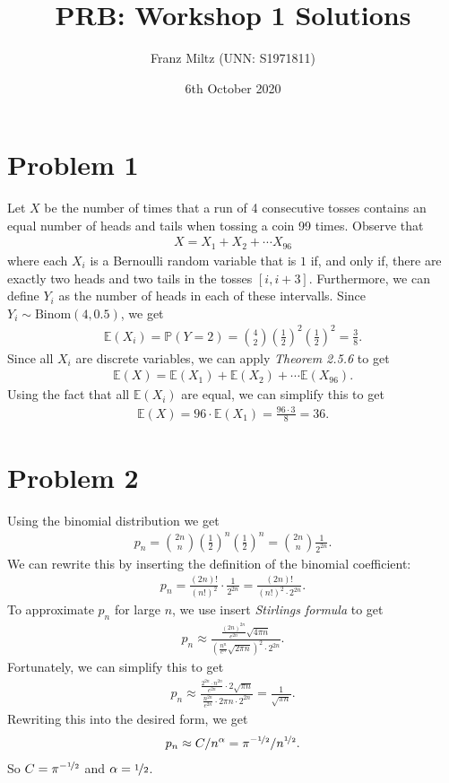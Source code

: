 \documentclass{article}
\title{PRB: Workshop 1 Solutions}
\author{Franz Miltz (UNN: S1971811)}
\renewcommand{\P}{\mathbb{P}}
\newcommand{\E}{\mathbb{E}}
\begin{document}
\date{6th October 2020}
\maketitle
\section*{Problem 1}
Let $X$ be the number of times that a run of 4 consecutive tosses
contains an equal number of heads and tails when tossing a coin 99 times.
Observe that
\begin{align*}
  X=X_1 + X_2 + \cdots X_{96}
\end{align*}
where each $X_i$ is a Bernoulli random variable that is $1$ if, 
and only if, there are exactly two heads and two tails in the tosses
$[i, i+3]$. Furthermore, we can define $Y_i$ as the number of heads
in each of these intervalls. Since $Y_i\sim \text{Binom}(4,0.5)$,
we get
\begin{align*}
  \E(X_i) = \P(Y=2) = \binom{4}{2}\left(\frac{1}{2}\right)^2\left(\frac{1}{2}\right)^2=\frac{3}{8}.
\end{align*}
Since all $X_i$ are discrete variables, we can apply \emph{Theorem 2.5.6}
to get
\begin{align*}
  \E(X) = \E(X_1) + \E(X_2) + \cdots \E(X_{96}).
\end{align*}
Using the fact that all $\E(X_i)$ are equal, we can simplify this to get
\begin{align*}
  \E(X) = 96\cdot\E(X_1) = \frac{96\cdot3}{8}=36.
\end{align*}
\section*{Problem 2}
Using the binomial distribution we get
\begin{align*}
  p_n = \binom{2n}{n}\left(\frac{1}{2}\right)^n\left(\frac{1}{2}\right)^n
  =\binom{2n}{n}\frac{1}{2^{2n}}.
\end{align*}
We can rewrite this by inserting the definition of the binomial
coefficient:
\begin{align*}
  p_n = \frac{(2n)!}{(n!)^2}\cdot\frac{1}{2^{2n}}=\frac{(2n)!}{(n!)^2\cdot 2^{2n}}.
\end{align*}
To approximate $p_n$ for large $n$, we use insert \emph{Stirlings formula}
to get
\begin{align*}
  p_n \approx \frac{
    \frac{(2n)^{2n}}{e^{2n}}\sqrt{4\pi n}
  }{
    \left(\frac{n^n}{e^n}\sqrt{2\pi n}\right)^2\cdot 2^{2n}}.
\end{align*}
Fortunately, we can simplify this to get
\begin{align*}
  p_n\approx \frac{
    \frac{2^{2n}\cdot n^{2n}}{e^{2n}}\cdot2\sqrt{\pi n}
  }{
    \frac{n^{2n}}{e^{2n}}\cdot 2\pi n\cdot 2^{2n}}=\frac{1}{\sqrt{\pi n}}.
\end{align*}
Rewriting this into the desired form, we get
\begin{align*}
  p_n\approx C / n^\alpha = \pi^{-\nicefrac{1}{2}}/n^{\nicefrac{1}{2}}.
\end{align*}
So $C=\pi^{-\nicefrac{1}{2}}$ and $\alpha=\nicefrac{1}{2}$.
\end{document}
